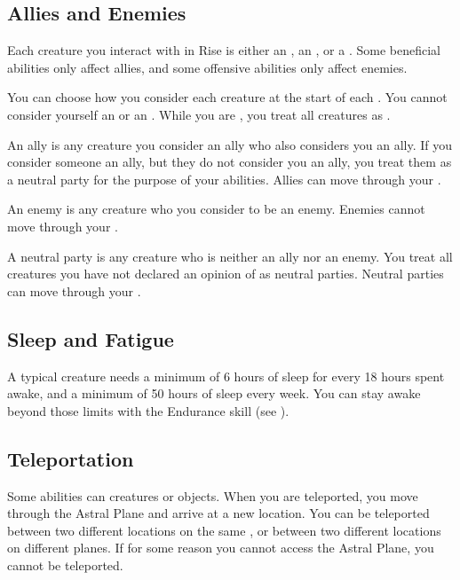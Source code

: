     \subsection{Allies and Enemies}\label{Allies and Enemies}
        Each creature you interact with in Rise is either an , an , or a .
        Some beneficial abilities only affect allies, and some offensive abilities only affect enemies.

        You can choose how you consider each creature at the start of each .
        You cannot consider yourself an  or an .
        While you are \unconscious, you treat all creatures as .

         An ally is any creature you consider an ally who also considers you an ally.
        If you consider someone an ally, but they do not consider you an ally, you treat them as a neutral party for the purpose of your abilities.
        Allies can move through your .

         An enemy is any creature who you consider to be an enemy.
        Enemies cannot move through your .

         A neutral party is any creature who is neither an ally nor an enemy.
        You treat all creatures you have not declared an opinion of as neutral parties.
        Neutral parties can move through your .

    \subsection{Sleep and Fatigue}\label{Sleep and Fatigue}
        A typical creature needs a minimum of 6 hours of sleep for every 18 hours spent awake, and a minimum of 50 hours of sleep every week.
        You can stay awake beyond those limits with the Endurance skill (see ).

    \subsection{Teleportation}\label{Teleportation}
        Some abilities can  creatures or objects.
        When you are teleported, you move through the Astral Plane and arrive at a new location.
        You can be teleported between two different locations on the same , or between two different locations on different planes.
        If for some reason you cannot access the Astral Plane, you cannot be teleported.

